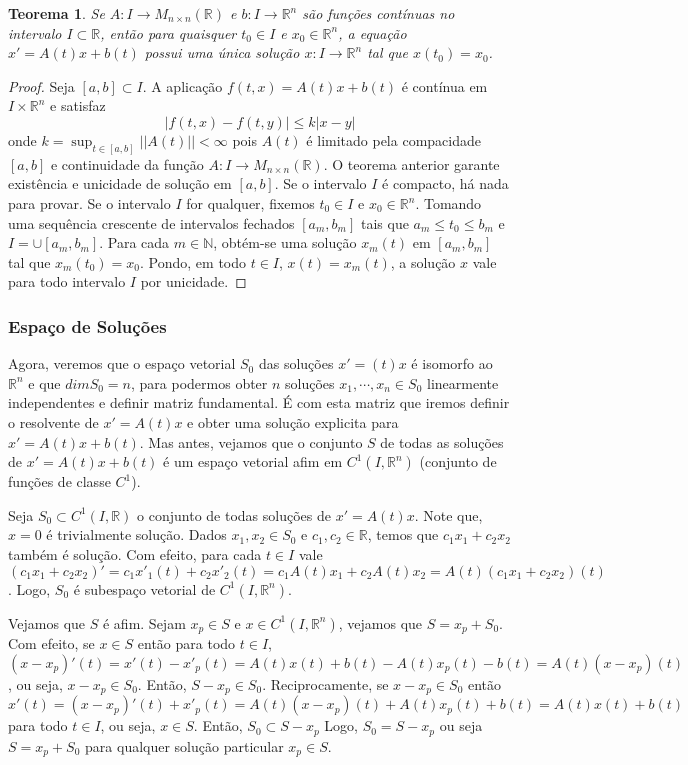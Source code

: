 \documentclass[a4paper, 12pt]{article}
\renewcommand{\Bbb}{\mathbb}
\newtheorem*{4}{Teorema}
\begin{document}
\begin{4}
Se $A:I\to M_{n\times n}(\Bbb R)$ e $b:I\to \Bbb R^n$ são funções contínuas no intervalo $I \subset \Bbb R$, então para quaisquer $t_0 \in I$ e $x_0 \in \Bbb R^n$, a equação $x' = A(t)x + b(t)$ possui uma única solução $x:I\to \Bbb R^n$ tal que $x(t_0) = x_0$.
\end{4}
\begin{proof}
Seja $[a,b] \subset I$. A aplicação $f(t,x)=A(t)x+b(t)$ é contínua em $I\times \Bbb R^n$ e satisfaz $$|f(t,x)-f(t,y)| \leq k|x-y|$$ onde $k = \sup_{t\in [a,b]}||A(t)|| < \infty$ pois $A(t)$ é limitado pela compacidade $[a,b]$ e continuidade da função $A:I\to M_{n\times n}(\Bbb R)$. O teorema anterior garante existência e unicidade de solução em $[a,b]$. Se o intervalo $I$ é compacto, há nada para provar. Se o intervalo $I$ for qualquer, fixemos $t_0\in I$ e $x_0\in \Bbb R^n$. Tomando uma sequência crescente de intervalos fechados $[a_m,b_m]$ tais que $a_m\leq t_0\leq b_m$ e $I=\cup[a_m,b_m]$. Para cada $m\in \Bbb N$, obtém-se uma solução $x_m(t)$ em $[a_m,b_m]$ tal que $x_m(t_0)=x_0$. Pondo, em todo $t\in I$, $x(t)=x_m(t)$, a solução $x$ vale para todo intervalo $I$ por unicidade. 
\end{proof}
\subsubsection{Espaço de Soluções}
Agora, veremos que o espaço vetorial $S_0$ das soluções $x'=(t)x$ é isomorfo ao $\Bbb R^n$ e que $dimS_0=n$, para podermos obter $n$ soluções $x_1,\cdots,x_n \in S_0$ linearmente independentes e definir matriz fundamental. É com esta matriz que iremos definir o resolvente de $x'=A(t)x$ e obter uma solução explicita para $x'=A(t)x+b(t)$. Mas antes, vejamos que o conjunto $S$ de todas as soluções de $x'=A(t)x+b(t)$ é um espaço vetorial afim em $C^1(I,\Bbb R^n)$ (conjunto de funções de classe $C^1$).

Seja $S_0 \subset C^1(I,\Bbb R)$ o conjunto de todas soluções de $x'=A(t)x$. Note que, $x=0$ é trivialmente solução. Dados $x_1,x_2 \in S_0$ e $c_1,c_2 \in \Bbb R$, temos que $c_1x_1 + c_2x_2$ também é solução. Com efeito, para cada $t\in I$ vale $(c_1x_1 + c_2x_2)'=c_1x'_1(t) + c_2x'_2(t)=c_1A(t)x_1 + c_2A(t)x_2=A(t)(c_1x_1 + c_2x_2)(t)$. Logo, $S_0$ é subespaço vetorial de $C^1(I,\Bbb R^n)$.

Vejamos que $S$ é afim. Sejam $x_p\in S$ e $x\in C^1(I,\Bbb R^n)$, vejamos que $S=x_p + S_0$. Com efeito, se $x \in S$ então para todo $t\in I$, $(x-x_p)'(t)=x'(t)-x'_p(t)=A(t)x(t)+b(t)-A(t)x_p(t)-b(t)=A(t)(x-x_p)(t)$, ou seja, $x-x_p\in S_0$. Então, $S-x_p \in S_0$. Reciprocamente, se $x-x_p\in S_0$ então $x'(t)=(x-x_p)'(t)+x'_p(t)=A(t)(x-x_p)(t)+A(t)x_p(t)+b(t)=A(t)x(t)+b(t)$ para todo $t\in I$, ou seja, $x\in S$. Então, $S_0\subset S-x_p$ Logo, $S_0=S-x_p$ ou seja $S=x_p+S_0$ para qualquer solução particular $x_p\in S$.
\end{document}
